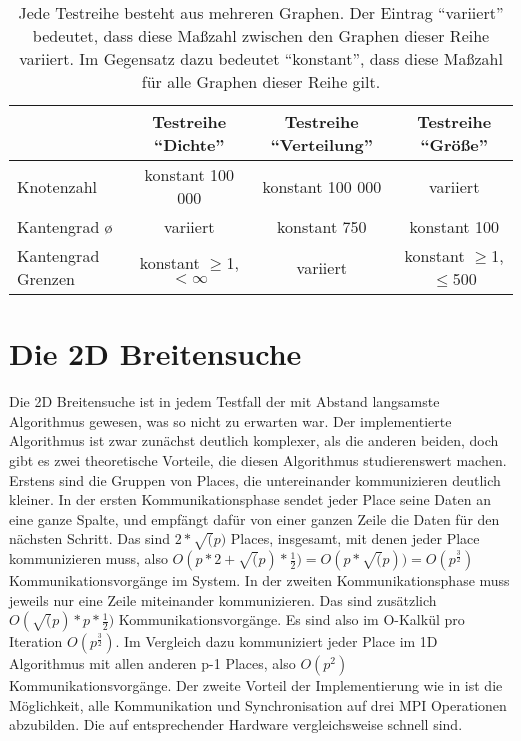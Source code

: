 \begin{table}
\label{tab:Testreihen}
\begin{tabular}{p{3.7cm}|c|c|c}
  & Testreihe \enquote{Dichte} & Testreihe \enquote{Verteilung} & Testreihe \enquote{Größe} \\ \hline \hline
  Knotenzahl & konstant 100 000 & konstant 100 000 & variiert\\
  Kantengrad \o & variiert & konstant 750 & konstant 100\\
  Kantengrad Grenzen & konstant $\ge$1, $<\infty$ & variiert & konstant $\ge$1, $\le$500\\
 \end{tabular}
  \caption{Jede Testreihe besteht aus mehreren Graphen. Der Eintrag \enquote{variiert} bedeutet, dass diese Maßzahl zwischen den Graphen dieser Reihe variiert. Im Gegensatz dazu bedeutet \enquote{konstant}, dass diese Maßzahl für alle Graphen dieser Reihe gilt.}
\end{table}

\newpage





\section{Die 2D Breitensuche} %
\label{sec:die_2d_breitensuche}
Die 2D Breitensuche ist in jedem Testfall der mit Abstand langsamste Algorithmus gewesen, was so nicht zu erwarten war. Der implementierte Algorithmus ist zwar zunächst deutlich komplexer, als die anderen beiden, doch gibt es zwei theoretische Vorteile, die diesen Algorithmus studierenswert machen. Erstens sind die Gruppen von Places, die untereinander kommunizieren deutlich kleiner. In der ersten Kommunikationsphase sendet jeder Place seine Daten an eine ganze Spalte, und empfängt dafür von einer ganzen Zeile die Daten für den nächsten Schritt. Das sind $2 * \sqrt(p)$ Places, insgesamt, mit denen jeder Place kommunizieren muss, also $O(p * 2 + \sqrt(p) * \frac{1}{2}) = O(p * \sqrt(p))= O(p^{\frac{3}{2}})$ Kommunikationsvorgänge im System. In der zweiten Kommunikationsphase muss jeweils nur eine Zeile miteinander kommunizieren. Das sind zusätzlich $O(\sqrt(p) * p * \frac{1}{2})$ Kommunikationsvorgänge. Es sind also im O-Kalkül pro Iteration $O(p^{\frac{3}{2}})$. Im Vergleich dazu kommuniziert jeder Place im 1D Algorithmus mit allen anderen p-1 Places, also $O(p^2)$ Kommunikationsvorgänge. Der zweite Vorteil der Implementierung wie in \cite{Buluc:2011} ist die Möglichkeit, alle Kommunikation und Synchronisation auf drei MPI Operationen abzubilden. Die auf entsprechender Hardware vergleichsweise schnell sind. 

